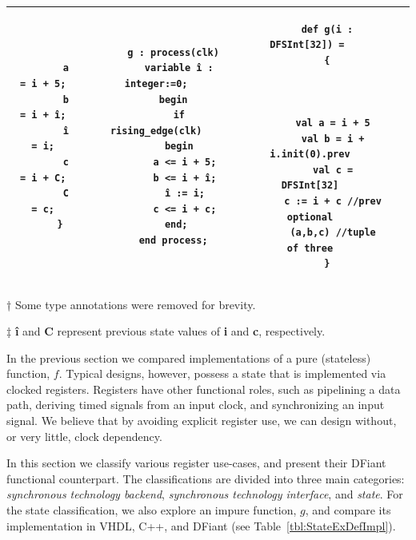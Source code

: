 \begin{table}
\begin{threeparttable}
\begin{tabular}{|c|c|c|c|c|}
\begin{minipage}[b]{0.14\linewidth}
\begin{verbatim}
        a = i + 5;
        b = i + î;
        î = i;
        c = i + C;
        C = c;
      }
		\end{verbatim}
	\end{minipage}
	&
	\begin{minipage}[b]{0.21\linewidth}
		\begin{verbatim}
      g : process(clk)
        variable î : integer:=0;
      begin
        if rising_edge(clk)
        begin
          a <= i + 5;
          b <= i + î;
          î := i;
          c <= i + c;
        end; 
      end process;
			\end{verbatim}
	\end{minipage}
	&
	\begin{minipage}[b]{0.23\linewidth}
		\begin{verbatim}
      def g(i : DFSInt[32]) = 
      {
        
        
        
        val a = i + 5
        val b = i + i.init(0).prev
        val c = DFSInt[32]
        c := i + c //prev optional
        (a,b,c) //tuple of three
      }
		\end{verbatim}
	\end{minipage}
  \\
  \hline
  \end{tabular}
  \begin{tablenotes}
    \item [†] Some type annotations were removed for brevity.
    \item [‡] \textbf{î} and \textbf{C} represent previous state values of \textbf{i} and \textbf{c}, respectively.
  \end{tablenotes}
  \end{threeparttable}
\end{table}%

In the previous section we compared implementations of a pure (stateless) function, $f$. Typical designs, however, possess a state that is implemented via clocked registers. Registers have other functional roles, such as pipelining a data path, deriving timed signals from an input clock, and synchronizing an input signal. We believe that by avoiding explicit register use, we can design without, or very little, clock dependency. 

In this section we classify various register use-cases, and present their DFiant functional counterpart. The classifications are divided into three main categories: \textit{synchronous technology backend}, \textit{synchronous technology interface}, and \textit{state}. For the state classification, we also explore an impure function, $g$, and compare its implementation in VHDL, C++, and DFiant (see Table~\ref{tbl:StateExDefImpl}).

